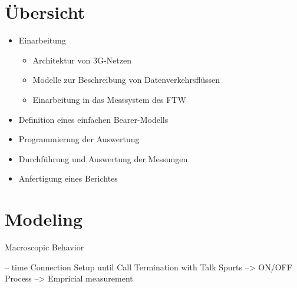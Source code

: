 









\section{Übersicht}

\begin{itemize}
\item Einarbeitung
	\begin{itemize}
		\item Architektur von 3G-Netzen
		\item Modelle zur Beschreibung von Datenverkehrsflüssen
		\item Einarbeitung in das Messsystem des FTW
	\end{itemize}
\item Definition eines einfachen Bearer-Modells
\item Programmierung der Auswertung
\item Durchführung und Auswertung der Messungen
\item Anfertigung eines Berichtes
\end{itemize}

\section{Modeling}
Macroscopic Behavior

	-- time Connection Setup until Call Termination with Talk Spurts
	--> ON/OFF Process
	--> Empricial measurement
	
